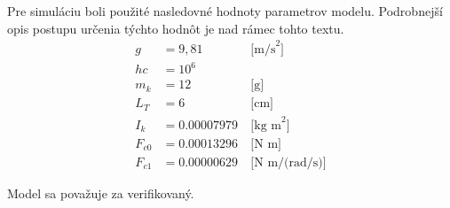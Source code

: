 \documentclass[a4paper, 10pt, ]{article}
\begin{document}
Pre simuláciu boli použité nasledovné hodnoty parametrov modelu. Podrobnejší opis postupu určenia týchto hodnôt je nad rámec tohto textu.
\begin{align*}
    g &= 9,81 &\ \text{[m/s}^2\text{]} \\
    hc &= 10^6 \\
    m_k &= 12 &\ \text{[g]} \\
    L_T &= 6 &\ \text{[cm]} \\
    I_k &= 0.00007979 &\ \text{[kg m}^2\text{]} \\
    F_{c0} &= 0.00013296 &\ \text{[N m]} \\
    F_{c1} &= 0.00000629 &\ \text{[N m/(rad/s)]}
\end{align*}


\noindent
Model sa považuje za verifikovaný.













\end{document}
